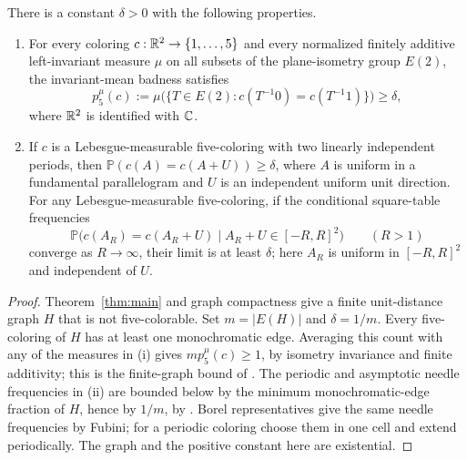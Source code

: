 \begin{samepage}
\begin{corollary}\label{cor:positive-badness}
There is a constant $\delta>0$ with the following properties.
\begin{enumerate}
\item[(i)] For every coloring $c:\mathbb R^2\to\{1,\ldots,5\}$ and every
normalized finitely additive left-invariant measure $\mu$ on all subsets
of the plane-isometry group $E(2)$, the invariant-mean badness satisfies
\[
 p_5^\mu(c):=\mu\bigl(\{T\in E(2):c(T^{-1}0)=c(T^{-1}1)\}\bigr)
 \ge\delta,
\]
where $\mathbb R^2$ is identified with $\mathbb C$.
\item[(ii)] If $c$ is a Lebesgue-measurable five-coloring with two
linearly independent periods, then
$\mathbb P(c(A)=c(A+U))\ge\delta$, where $A$ is uniform in a
fundamental parallelogram and $U$ is an independent uniform unit
direction. For any Lebesgue-measurable five-coloring, if the conditional
square-table frequencies
\[
 \mathbb P\bigl(c(A_R)=c(A_R+U)\mid A_R+U\in[-R,R]^2\bigr)
 \qquad(R>1)
\]
converge as $R\to\infty$, their limit is at least $\delta$; here
$A_R$ is uniform in $[-R,R]^2$ and independent of $U$.
\end{enumerate}
\end{corollary}
\end{samepage}

\begin{proof}
Theorem~\ref{thm:main} and graph compactness
\citep[Theorem~1]{deBruijnErdos1951} give a finite unit-distance graph
$H$ that is not five-colorable. Set $m=|E(H)|$ and $\delta=1/m$.
Every five-coloring of $H$ has at least one monochromatic edge.
Averaging this count with any of the measures in (i) gives
$mp_5^\mu(c)\ge1$, by isometry invariance and finite additivity;
this is the finite-graph bound of
\citet[Lemma~2.10 and Theorem~2.11]{GwynStavrianos2020}.
The periodic and asymptotic needle frequencies in (ii) are bounded
below by the minimum monochromatic-edge fraction of $H$, hence by
$1/m$, by \citet[Theorems~1--2]{BourgeatHeinrichMelottiRobert2015}.
Borel representatives give the same needle frequencies by Fubini;
for a periodic coloring choose them in one cell and extend periodically.
The graph and the positive constant here are existential.
\end{proof}
